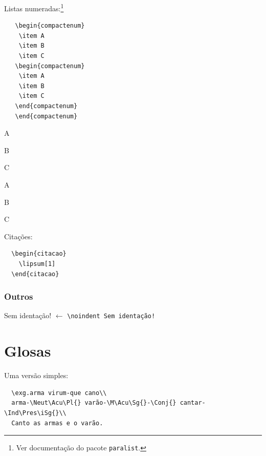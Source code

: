 \documentclass[hittite,linearb,armenian,hebraico,russian,sanskrit]{tesecaiera}
\begin{document}
   \noindent Listas numeradas:\footnote{Ver documentação do pacote
   \texttt{paralist}.}
  \begin{lstlisting}
   \begin{compactenum}
    \item A
    \item B
    \item C
   \begin{compactenum}
    \item A
    \item B
    \item C
   \end{compactenum}
   \end{compactenum}
  \end{lstlisting}
   \begin{compactenum}
    \item A
    \item B
    \item C
   \begin{compactenum}
    \item A
    \item B
    \item C
   \end{compactenum}
   \end{compactenum}

\noindent  Citações:
\begin{lstlisting}
  \begin{citacao}
    \lipsum[1]
  \end{citacao}
\end{lstlisting}
  \begin{citacao}
    \lipsum[1]
  \end{citacao}

\subsection*{Outros}

\noindent Sem identação! $\leftarrow$ \lstinline{\noindent Sem identação!}

\chapter{Glosas}

Uma versão simples:

\begin{lstlisting}
  \exg.arma virum-que cano\\
  arma-\Neut\Acu\Pl{} varão-\M\Acu\Sg{}-\Conj{} cantar-\Ind\Pres\iSg{}\\
  Canto as armas e o varão.
\end{lstlisting}
\end{document}
